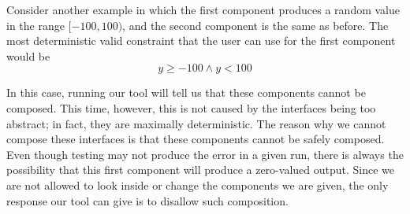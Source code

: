 \documentclass[preprint,11pt]{sigplanconf}
\begin{document}
Consider another example in which the first component produces a random value
in the range $[-100, 100)$, and the second component is the same as
before.
The most deterministic valid constraint that the user can use for the first
component would be
\[
y \ge -100 \wedge y < 100
\]

In this case, running our tool will tell us that these components cannot be
composed.
This time, however, this is not caused by the interfaces being too abstract;
in fact, they are maximally deterministic.
The reason why we cannot compose these interfaces is that these components
cannot be safely composed.
Even though testing may not produce the error in a given run, there is always
the possibility that this first component will produce a zero-valued output. 
Since we are not allowed to look inside or change the components we are given,
the only response our tool can give is to disallow such composition.
\end{document}
